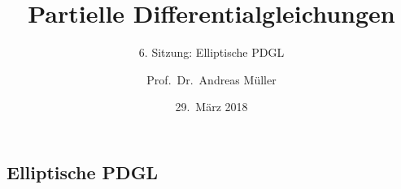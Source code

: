 \documentclass[handout]{beamer}
\title[]{Partielle Differentialgleichungen}
\subtitle{6. Sitzung: Elliptische PDGL}
\date[29.~März 2018]{29.~März 2018}
\author{Prof.~Dr.~Andreas Müller}
\begin{document}
\begin{frame}
\section{Elliptische PDGL}
\titlepage

\end{frame}


\end{document}
